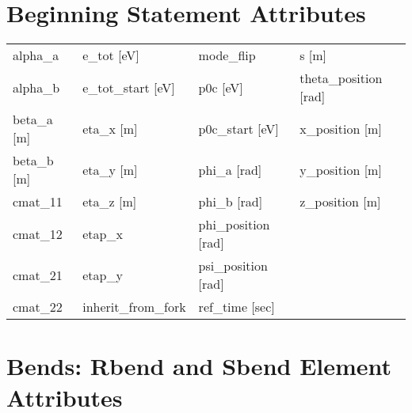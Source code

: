 \vfill
 
 \section{Beginning Statement Attributes}
 \label{s:list.beginning}
 
 \begin{tabular}{llll} \toprule
alpha_a                          & e_tot [eV]                       & mode_flip                        & s [m]                            \\
alpha_b                          & e_tot_start [eV]                 & p0c [eV]                         & theta_position [rad]             \\
beta_a [m]                       & eta_x [m]                        & p0c_start [eV]                   & x_position [m]                   \\
beta_b [m]                       & eta_y [m]                        & phi_a [rad]                      & y_position [m]                   \\
cmat_11                          & eta_z [m]                        & phi_b [rad]                      & z_position [m]                   \\
cmat_12                          & etap_x                           & phi_position [rad]               &                                  \\
cmat_21                          & etap_y                           & psi_position [rad]               &                                  \\
cmat_22                          & inherit_from_fork                & ref_time [sec]                   &                                  \\
 \bottomrule
 \end{tabular}
 \vfill
 
 \section{Bends: Rbend and Sbend Element Attributes}
 \label{s:list.bend}
 
